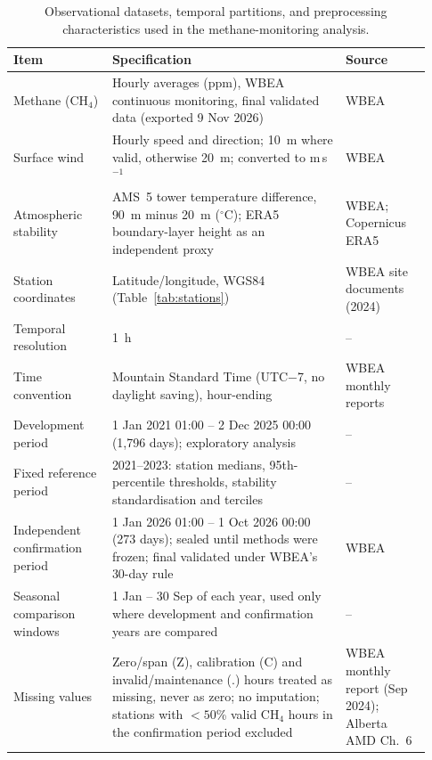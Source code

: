 \begin{table}[t]
\centering
\caption{Observational datasets, temporal partitions, and preprocessing characteristics used in the methane-monitoring analysis.}
\label{tab:data}
\small
\begin{tabular}{p{0.22\linewidth}p{0.52\linewidth}p{0.19\linewidth}}
\toprule
Item & Specification & Source \\
\midrule
Methane (CH$_4$) & Hourly averages (ppm), WBEA continuous monitoring, final validated data (exported 9 Nov 2026) & WBEA \\
Surface wind & Hourly speed and direction; 10~m where valid, otherwise 20~m; converted to m\,s$^{-1}$ & WBEA \\
Atmospheric stability & AMS~5 tower temperature difference, 90~m minus 20~m ($^\circ$C); ERA5 boundary-layer height as an independent proxy & WBEA; Copernicus ERA5 \\
Station coordinates & Latitude/longitude, WGS84 (Table~\ref{tab:stations}) & WBEA site documents (2024) \\
Temporal resolution & 1~h & -- \\
Time convention & Mountain Standard Time (UTC$-$7, no daylight saving), hour-ending & WBEA monthly reports \\
Development period & 1 Jan 2021 01:00 -- 2 Dec 2025 00:00 (1,796 days); exploratory analysis & -- \\
Fixed reference period & 2021--2023: station medians, 95th-percentile thresholds, stability standardisation and terciles & -- \\
Independent confirmation period & 1 Jan 2026 01:00 -- 1 Oct 2026 00:00 (273 days); sealed until methods were frozen; final validated under WBEA's 30-day rule & WBEA \\
Seasonal comparison windows & 1 Jan -- 30 Sep of each year, used only where development and confirmation years are compared & -- \\
Missing values & Zero/span (Z), calibration (C) and invalid/maintenance (.) hours treated as missing, never as zero; no imputation; stations with $<50$\% valid CH$_4$ hours in the confirmation period excluded & WBEA monthly report (Sep 2024); Alberta AMD Ch.~6 \\
\bottomrule
\end{tabular}
\end{table}
